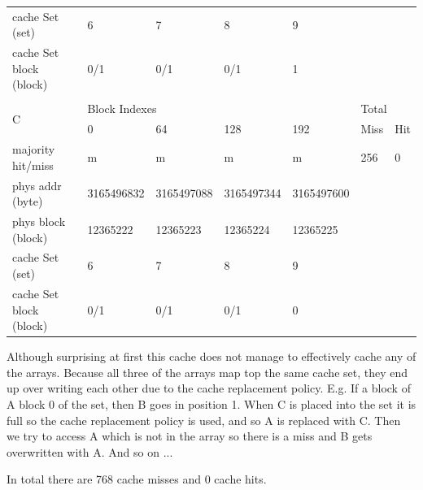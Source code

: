 \documentclass[12pt]{article}
\begin{document}
\begin{table}[H]
\begin{tabular}{lllllll}
\multicolumn{1}{l|}{cache Set (set)}         & 6          & 7          & 8          & \multicolumn{1}{l|}{9}          &              &             \\
\multicolumn{1}{l|}{cache Set block (block)} & 0/1        & 0/1        & 0/1        & \multicolumn{1}{l|}{1}          &              &             \\
                                             &            &            &            &                                 &              &             \\
\multicolumn{1}{l|}{\multirow{2}{*}{C}}      & \multicolumn{4}{l|}{Block Indexes}                                     & \multicolumn{2}{l}{Total} \\
\multicolumn{1}{l|}{}                        & 0          & 64         & 128        & \multicolumn{1}{l|}{192}        & Miss         & Hit         \\ \hline
\multicolumn{1}{l|}{majority hit/miss}       & m          & m          & m          & \multicolumn{1}{l|}{m}          & 256          & 0           \\
\multicolumn{1}{l|}{phys addr (byte)}        & 3165496832 & 3165497088 & 3165497344 & \multicolumn{1}{l|}{3165497600} &              &             \\
\multicolumn{1}{l|}{phys block (block)}      & 12365222   & 12365223   & 12365224   & \multicolumn{1}{l|}{12365225}   &              &             \\
\multicolumn{1}{l|}{cache Set (set)}         & 6          & 7          & 8          & \multicolumn{1}{l|}{9}          &              &             \\
\multicolumn{1}{l|}{cache Set block (block)} & 0/1        & 0/1        & 0/1        & \multicolumn{1}{l|}{0}          &              &            
\end{tabular}
\end{table}

			Although surprising at first this cache does not manage to effectively cache any of the arrays. Because all three of the arrays map top the same cache set, they end up over writing each other due to the cache replacement policy. E.g. If a block of A block 0 of the set, then B goes in position 1. When C is placed into the set it is full so the cache replacement policy is used, and so A is replaced with C. Then we try to access A which is not in the array so there is a miss and B gets overwritten with A. And so on ...
			
			In total there are 768 cache misses and 0 cache hits.
\end{document}

